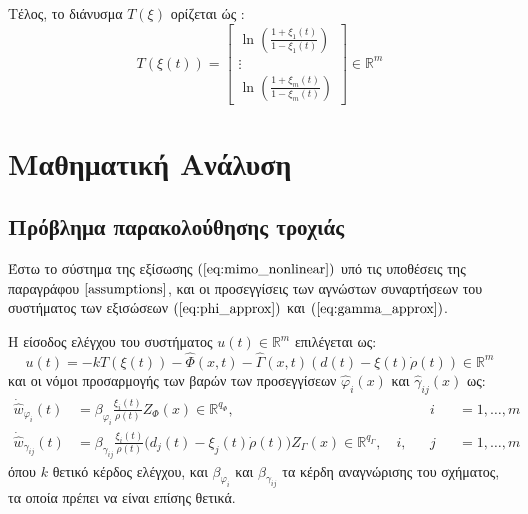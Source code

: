 Τέλος, το διάνυσμα $T(\xi)$ ορίζεται ώς :
\begin{equation*}
	T(\xi(t)) = \begin{bmatrix}
	\ln \left( \frac{1 + \xi_1(t)}{1 - \xi_1(t)} \right) \\
	\vdots \\
	\ln \left( \frac{1 + \xi_m(t)}{1 - \xi_m(t)} \right)
	\end{bmatrix}
	\in \mathbb{R}^m
\end{equation*}


\section{Μαθηματική Ανάλυση}
\subsection{Πρόβλημα παρακολούθησης τροχιάς} \label{subsec:traj_tracking}
Έστω το σύστημα της εξίσωσης $(\ref{eq:mimo_nonlinear})$ υπό τις υποθέσεις της παραγράφου $\ref{assumptions}$, και οι προσεγγίσεις των αγνώστων συναρτήσεων του συστήματος των εξισώσεων $(\ref{eq:phi_approx})$ και $(\ref{eq:gamma_approx})$.

Η είσοδος ελέγχου του συστήματος $u(t) \in \mathbb{R}^m$ επιλέγεται ως:
\begin{equation}
	u(t) = -k T(\xi(t)) - \hat{\Phi}(x,t) 
	     - \hat{\Gamma}(x,t) \left( d(t) - \xi(t) \dot{\rho}(t) \right)
	     \in \mathbb{R}^m
	\label{eq:schema_control_input}
\end{equation}
και οι νόμοι προσαρμογής των βαρών των προσεγγίσεων $\hat{\varphi}_i(x)$ και $\hat{\gamma}_{ij}(x)$ ως:
\begin{equation}
\begin{alignedat}{3}
	\dot{\hat{w}}_{\varphi_i}(t) &= 
	\beta_{\varphi_i} \frac{\xi_i(t)}{\rho(t)} Z_{\Phi}(x) 
	\in \mathbb{R}^{q_{\Phi}}, \quad &&i &&= 1,\dots,m \\
	\dot{\hat{w}}_{\gamma_{ij}}(t) &= \beta_{\gamma_{ij}} \frac{\xi_i(t)}{\rho(t)}
	\big( d_j(t) - \xi_j(t) \dot{\rho}(t) \big) Z_{\Gamma}(x)
	\in \mathbb{R}^{q_{\Gamma}},
	\quad i,&&j &&= 1,\dots,m
\end{alignedat}
\label{eq:schema_adapt_laws}
\end{equation}
όπου $k$ θετικό κέρδος ελέγχου, και $\beta_{\varphi_i}$ και $\beta_{\gamma_{ij}}$ τα κέρδη αναγνώρισης του σχήματος, τα οποία πρέπει να είναι επίσης θετικά.


